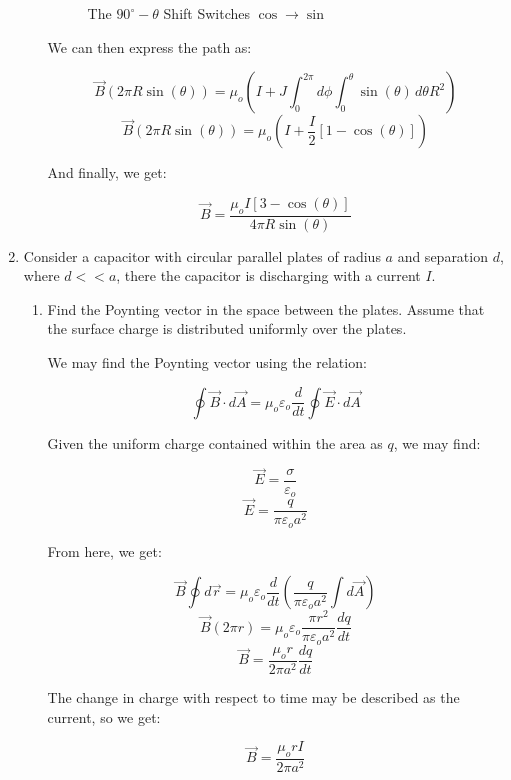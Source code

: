 \begin{enumerate}
\begin{enumerate}
        \begin{figure}[h]
          \centering
          
          \caption{The $90^{\circ}-\theta$ Shift Switches $\cos\to\sin$}
          \label{fig:1}
        \end{figure}

        We can then express the path as:

        $$\vec{B}(2\pi R\sin(\theta))=\mu_o\left(I+J\int_0^{2\pi}d\phi\int_0^\theta \sin(\theta)\,d\theta R^2\right)$$
        $$\vec{B}(2\pi R\sin(\theta))=\mu_o\left(I+\frac{I}{2}\left[ 1-\cos(\theta) \right]\right)$$

        And finally, we get:

        $$\boxed{\vec{B}=\frac{\mu_o I[3-\cos(\theta)]}{4\pi R\sin(\theta)}}$$

    \end{enumerate}

  \item Consider a capacitor with circular parallel plates of radius $a$ and separation $d$, where $d<<a$, there the capacitor is discharging with a current $I$.

    \begin{enumerate}

      \item Find the Poynting vector in the space between the plates. Assume that the surface charge is distributed uniformly over the plates.

        We may find the Poynting vector using the relation:

        $$\oint \vec{B}\cdot d\vec{A}=\mu_o\varepsilon_o\frac{d}{dt}\oint \vec{E}\cdot d\vec{A}$$

        Given the uniform charge contained within the area as $q$, we may find:

        $$\vec{E}=\frac{\sigma}{\varepsilon_o}$$
        $$\vec{E}=\frac{q}{\pi\varepsilon_o a^2}$$

        From here, we get:

        $$\vec{B}\oint d\vec{r}=\mu_o\varepsilon_o\frac{d}{dt}\left(\frac{q}{\pi\varepsilon_o a^2} \int d\vec{A}\right)$$
        $$\vec{B}(2\pi r)=\mu_o\varepsilon_o\frac{\pi r^2}{\pi\varepsilon_o a^2}\frac{dq}{dt}$$
        $$\vec{B}=\frac{\mu_or}{2\pi a^2}\frac{dq}{dt}$$

        The change in charge with respect to time may be described as the current, so we get:

        $$\vec{B}=\frac{\mu_orI}{2\pi a^2}$$


\end{enumerate}
\end{enumerate}
